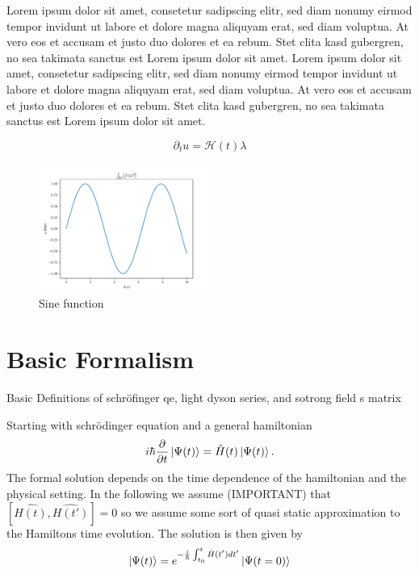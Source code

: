 Lorem ipsum dolor sit amet, consetetur sadipscing elitr, sed diam nonumy eirmod tempor invidunt ut labore et dolore magna aliquyam erat, sed diam voluptua. At vero eos et accusam et justo duo dolores et ea rebum. Stet clita kasd gubergren, no sea takimata sanctus est Lorem ipsum dolor sit amet. Lorem ipsum dolor sit amet, consetetur sadipscing elitr, sed diam nonumy eirmod tempor invidunt ut labore et dolore magna aliquyam erat, sed diam voluptua. At vero eos et accusam et justo duo dolores et ea rebum. Stet clita kasd gubergren, no sea takimata sanctus est Lorem ipsum dolor sit amet.

\begin{equation}
    \partial_t u = \mathcal{H}(t)  \lambda 
\end{equation}

\begin{figure}[H]
    \centering
    \includegraphics[width=0.5\textwidth]{figures/plot.pdf}
    \caption{Sine function}
    \label{fig:sinus}
\end{figure}




\newpage
\section{Basic Formalism}

Basic Definitions of schröfinger qe, light dyson series, and sotrong field s matrix

Starting with schrödinger equation and a general hamiltonian
\begin{equation}
    i \hbar \frac{\partial}{\partial t} \ket{\Psi(t)} = \hat{H}(t) \ket{\Psi(t)}.
\end{equation}
The formal solution depends on the time dependence of the hamiltonian and the physical setting. In the following we assume (IMPORTANT) that $[\hat{H(t)}, \hat{H(t')}] = 0$ so we assume some sort of quasi static approximation to the Hamiltons time evolution. 
The solution is then given by 
\begin{equation}
    \ket{\Psi(t)} = e^{-\frac{i}{\hbar} \int_{t_0}^{t} \hat{H}(t') dt'} \ket{\Psi(t=0)}
\end{equation}





